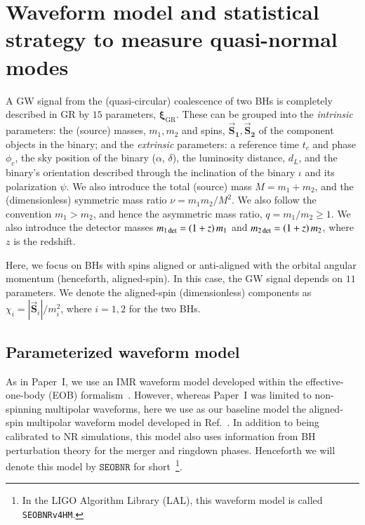 \documentclass[twocolumn,prd,aps,superscriptaddress,preprintnumbers,tightenlines,showpacs,nofootinbib,eqsecnum,amsfonts,amsmath]{revtex4-1}
\newcommand{\paperone}{Paper~I\xspace}
\newcommand{\bxigr}{\bm{\xi}_{\text{GR}}}
\newcommand{\bs}[1]{\bm{\vec{S}_{#1}}}
\newcommand{\SEOB}{\texttt{SEOBNR}}
\begin{document}
\section{Waveform model and statistical strategy to measure quasi-normal modes}
A GW signal from the (quasi-circular) coalescence of two BHs is
completely described in GR by $15$ parameters,
$\bxigr$. These can be grouped into the \emph{intrinsic} parameters:
the (source) masses, $m_1, m_2$ and spins, $\bs1, \bs2$ of the component
objects in the binary; and the
\emph{extrinsic} parameters: a reference time $t_c$ and phase
$\phi_c$, the sky position of the binary ($\alpha$,
$\delta$), the luminosity distance, $d_L$, and the binary's orientation
described through the inclination of the binary $\iota$ and its
polarization $\psi$. We also introduce the total (source) mass $M = m_1+m_2$,
and the (dimensionless) symmetric mass ratio $\nu = m_1m_2/M^2$. We also follow the convention $m_1 > m_2$, and hence the asymmetric mass ratio, $q = m_1/m_2 \geq1$. We also introduce the detector masses $m_{1\,\rm det}= (1+z)\,m_1$ and $m_{2 \,\rm det} = (1+z)\,m_2$, 
where $z$ is the redshift.

Here, we focus on BHs with spins aligned or anti-aligned
with the orbital angular momentum (henceforth, aligned-spin). In this case,
the GW signal depends on $11$ parameters. We denote the
aligned-spin (dimensionless) components as $\chi_{i} = |\vec{\bm{S}}_i|/m^2_i$, where $i=1,2$ for the two BHs.

\subsection{Parameterized waveform model}\label{sec:model}

As in \paperone, we use an IMR waveform model developed within the effective-one-body (EOB)
formalism~\cite{Buonanno:1998gg,Buonanno:2000ef}. However, whereas \paperone was limited to non-spinning multipolar waveforms,
here we use as our baseline model the aligned-spin multipolar waveform model
developed in Ref.~\cite{Cotesta:2018fcv}. In addition to being
calibrated to NR simulations, this model also uses information from BH
perturbation theory for the merger and ringdown phases. Henceforth we
will denote this model by $\SEOB$ for short~\footnote{In the LIGO Algorithm Library (LAL), this
waveform model is called {\tt SEOBNRv4HM}.}.
\end{document}
